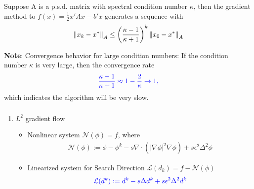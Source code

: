 \documentclass[amstex]{beamer}
\newcommand{\wuhao}{\fontsize{10.5pt}{\baselineskip}\selectfont}    %
\begin{document}
\begin{CJK*}{GBK}{kai}
\begin{frame}
	\frametitle{\wuhao{\bf Properties of Steepest Descent}}
	\begin{theorem}
		Suppose A is a p.s.d. matrix with spectral condition number $\kappa$, then the gradient method to $f(x)=\frac{1}{2}x'Ax-b'x$ generates a sequence with 
		\begin{eqnarray*}
			\left\|x_k-x^*\right\|_A\leq \bigg(\frac{\kappa-1}{\kappa+1}\bigg)^k \left\|x_0-x^*\right\|_A
		\end{eqnarray*}
	\end{theorem}
	{\bf Note}: Convergence behavior for large condition numbers:
	If the condition number $\kappa$ is very large, then the convergence rate
	\begin{eqnarray*}
		{\color{blue}\frac{\kappa-1}{\kappa+1}\approx 1- \frac{2}{\kappa} \to 1,}
	\end{eqnarray*}
	which indicates the algorithm will be very slow.
\end{frame}
\begin{frame}
	\frametitle{\wuhao{\bf Preconditioned Steepest Decent Algorithm}}
	\begin{enumerate}
	\item $L^2$ gradient flow {}
    \begin{itemize}
    	\item  Nonlinear system $\mathcal{N}(\phi)=f$, where
    	\begin{eqnarray*}
    		\mathcal{N}(\phi) :=\phi-\phi^k- s\nabla \cdot \left( \left| \nabla \phi\right|^2 \nabla \phi \right) +s\epsilon^2 \Delta^2 \phi
    	\end{eqnarray*}
    	\item Linearized system for Search Direction $\mathcal{L}(d_k) =f-\mathcal{N}(\phi)$
    	   \begin{eqnarray*}
    	   {\color{blue} \mathcal{L}(d^k) := d^k- s \Delta d^k +s\epsilon^2 \Delta^2 d^k}
    	   \end{eqnarray*}
    \end{itemize}
    

\end{enumerate}
\end{frame}
\end{CJK*}
\end{document}
